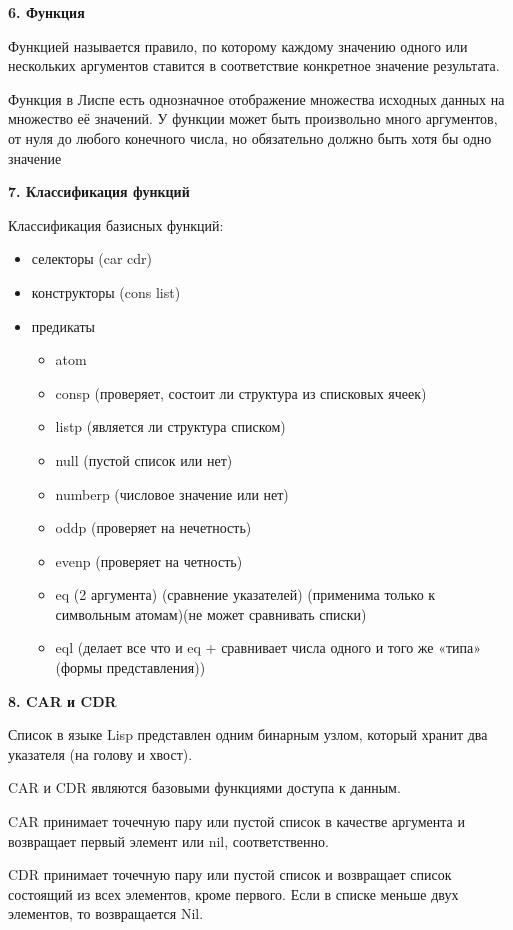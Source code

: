 \textbf{6. Функция}

Функцией называется правило, по которому каждому значению одного или нескольких аргументов ставится в соответствие конкретное значение результата.

Функция в Лиспе есть однозначное отображение множества исходных данных на множество её значений. У функции может быть произвольно много аргументов, от нуля до любого конечного числа, но обязательно должно быть хотя бы одно значение

\textbf{7. Классификация функций}

Классификация базисных функций:
\begin{itemize}
	\item селекторы (car cdr)
	\item конструкторы (cons list)
	\item предикаты 
	\begin{itemize}
		\item atom
		\item consp (проверяет, состоит ли структура из списковых ячеек) 
		\item listp (является ли структура списком)
		\item null (пустой список или нет)
		\item numberp (числовое значение или нет)
		\item oddp (проверяет на нечетность)
		\item evenp (проверяет на четность)
		\item eq (2 аргумента) (сравнение указателей) (применима только к символьным атомам)(не может сравнивать списки)
		\item eql (делает все что и eq + сравнивает числа одного и того же «типа» (формы представления))
	\end{itemize}
\end{itemize}


\textbf{8. CAR и CDR}

Список в языке Lisp представлен одним бинарным узлом, который хранит два указателя (на голову и хвост). 

CAR и CDR являются базовыми функциями доступа к данным. 

CAR принимает точечную пару или пустой список в качестве аргумента и возвращает первый элемент или nil, соответственно. 

CDR принимает точечную пару или пустой список и возвращает список состоящий из всех элементов, кроме первого. Если в списке меньше двух элементов, то возвращается Nil.


